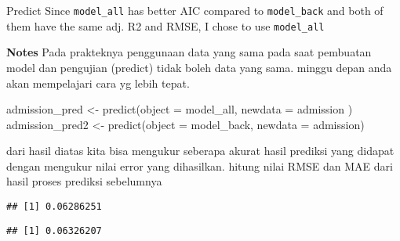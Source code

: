 \documentclass[
  ignorenonframetext,
]{beamer}
\newenvironment{Shaded}{\begin{snugshade}}{\end{snugshade}}
\newcommand{\AttributeTok}[1]{\textcolor[rgb]{0.77,0.63,0.00}{#1}}
\newcommand{\FunctionTok}[1]{\textcolor[rgb]{0.00,0.00,0.00}{#1}}
\newcommand{\NormalTok}[1]{#1}
\newcommand{\OtherTok}[1]{\textcolor[rgb]{0.56,0.35,0.01}{#1}}
\newcommand{\SpecialCharTok}[1]{\textcolor[rgb]{0.00,0.00,0.00}{#1}}
\begin{document}
\begin{frame}[fragile]{Predict}
\protect\hypertarget{predict}{}
Since \texttt{model\_all} has better AIC compared to
\texttt{model\_back} and both of them have the same adj. R2 and RMSE, I
chose to use \texttt{model\_all}

\textbf{Notes} Pada prakteknya penggunaan data yang sama pada saat
pembuatan model dan pengujian (predict) tidak boleh data yang sama.
minggu depan anda akan mempelajari cara yg lebih tepat.

\begin{Shaded}
\begin{Highlighting}[]
\NormalTok{admission\_pred }\OtherTok{\textless{}{-}} \FunctionTok{predict}\NormalTok{(}\AttributeTok{object =}\NormalTok{ model\_all, }\AttributeTok{newdata =}\NormalTok{ admission )}
\NormalTok{admission\_pred2 }\OtherTok{\textless{}{-}} \FunctionTok{predict}\NormalTok{(}\AttributeTok{object =}\NormalTok{ model\_back, }\AttributeTok{newdata =}\NormalTok{ admission)}
\end{Highlighting}
\end{Shaded}

dari hasil diatas kita bisa mengukur seberapa akurat hasil prediksi yang
didapat dengan mengukur nilai error yang dihasilkan. hitung nilai RMSE
dan MAE dari hasil proses prediksi sebelumnya

\begin{Shaded}
\end{Shaded}

\begin{verbatim}
## [1] 0.06286251
\end{verbatim}

\begin{Shaded}
\end{Shaded}

\begin{verbatim}
## [1] 0.06326207
\end{verbatim}


\end{frame}
\end{document}
